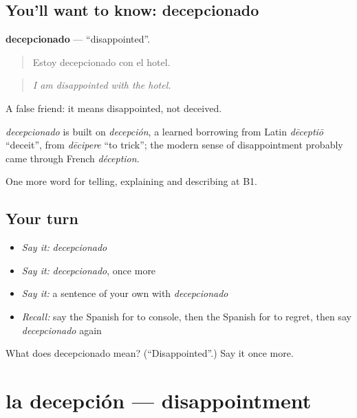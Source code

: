 \subsection*{You'll want to know: decepcionado}
\textbf{decepcionado} — \textquotedblleft{}disappointed\textquotedblright{}.

\begin{quote}
Estoy decepcionado con el hotel.
\end{quote}

\begin{quote}
\emph{I am disappointed with the hotel.}
\end{quote}

A false friend: it means disappointed, not deceived.

\begin{cousinweb}
\emph{decepcionado} is built on \emph{decepción}, a learned borrowing from Latin \emph{dēceptiō} \textquotedblleft{}deceit\textquotedblright{}, from \emph{dēcipere} \textquotedblleft{}to trick\textquotedblright{}; the modern sense of disappointment probably came through French \emph{déception}.
\end{cousinweb}

\begin{grammarlens}[title={What you've built}]
One more word for telling, explaining and describing at B1.
\end{grammarlens}

\subsection*{Your turn}
\begin{itemize}
\raggedright
  \item \emph{Say it:} \emph{decepcionado}
  \item \emph{Say it:} \emph{decepcionado}, once more
  \item \emph{Say it:} a sentence of your own with \emph{decepcionado}
  \item \emph{Recall:} say the Spanish for to console, then the Spanish for to regret, then say \emph{decepcionado} again
\end{itemize}

\begin{tcolorbox}[breakable,colback=teal!4,colframe=teal!35!black,title={Before you move on}]
What does decepcionado mean? (\textquotedblleft{}Disappointed\textquotedblright{}.) Say it once more.
\end{tcolorbox}
\section[la decepción]{la decepción — disappointment}

